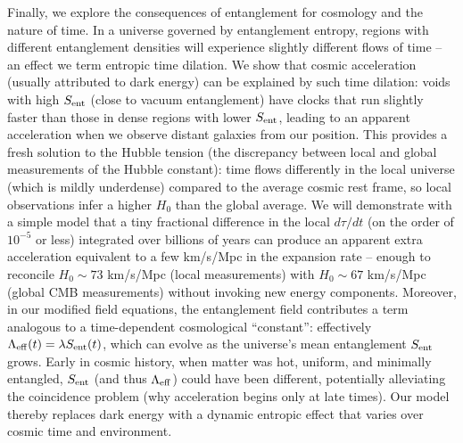 \documentclass[11pt]{article}
\begin{document}
Finally, we explore the consequences of entanglement for cosmology and the nature of time. In a universe governed by entanglement entropy, regions with different entanglement densities will experience slightly different flows of time – an effect we term entropic time dilation. We show that cosmic acceleration (usually attributed to dark energy) can be explained by such time dilation: voids with high $S_{\rm ent}$ (close to vacuum entanglement) have clocks that run slightly faster than those in dense regions with lower $S_{\rm ent}$, leading to an apparent acceleration when we observe distant galaxies from our position. This provides a fresh solution to the Hubble tension (the discrepancy between local and global measurements of the Hubble constant): time flows differently in the local universe (which is mildly underdense) compared to the average cosmic rest frame, so local observations infer a higher $H_0$ than the global average. We will demonstrate with a simple model that a tiny fractional difference in the local $d\tau/dt$ (on the order of $10^{-5}$ or less) integrated over billions of years can produce an apparent extra acceleration equivalent to a few km/s/Mpc in the expansion rate – enough to reconcile $H_0 \sim 73$ km/s/Mpc (local measurements) with $H_0 \sim 67$ km/s/Mpc (global CMB measurements) without invoking new energy components. Moreover, in our modified field equations, the entanglement field contributes a term analogous to a time-dependent cosmological “constant”: effectively $\Lambda_{\rm eff}(t) = \lambda S_{\rm ent}(t)$, which can evolve as the universe’s mean entanglement $S_{\rm ent}$ grows. Early in cosmic history, when matter was hot, uniform, and minimally entangled, $S_{\rm ent}$ (and thus $\Lambda_{\rm eff}$) could have been different, potentially alleviating the coincidence problem (why acceleration begins only at late times). Our model thereby replaces dark energy with a dynamic entropic effect that varies over cosmic time and environment.
\end{document}
